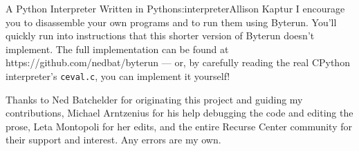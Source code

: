 \begin{aosachapter}{A Python Interpreter Written in Python}{s:interpreter}{Allison Kaptur}
I encourage you to disassemble your own programs and to run them using
Byterun. You'll quickly run into instructions that this shorter version
of Byterun doesn't implement. The full implementation can be found at
https://github.com/nedbat/byterun --- or, by carefully reading the real
CPython interpreter's \texttt{ceval.c}, you can implement it yourself!

\label{acknowledgements}

Thanks to Ned Batchelder for originating this project and guiding my
contributions, Michael Arntzenius for his help debugging the code and
editing the prose, Leta Montopoli for her edits, and the entire Recurse
Center community for their support and interest. Any errors are my own.

\end{aosachapter}
